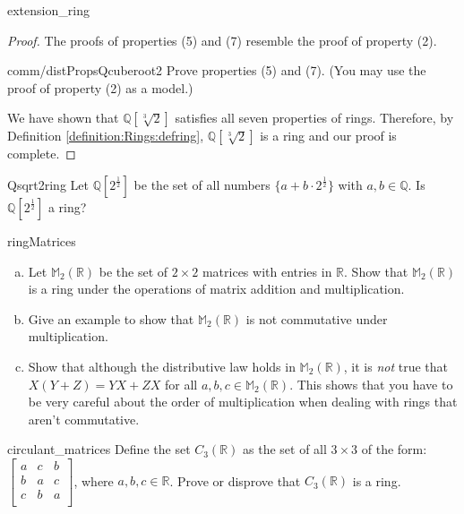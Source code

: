 \begin{example}{extension_ring}
\begin{proof}
The proofs of properties (5) and (7) resemble the proof of property (2).

\begin{exercise}{comm/distPropsQcuberoot2}
Prove properties (5) and (7). (You may use the proof of property (2) as a model.)
\end{exercise}{}

We have shown that ${\mathbb Q}[\sqrt[3]{2}]$ satisfies all seven properties of rings. Therefore, by Definition \ref{definition:Rings:defring}, ${\mathbb Q}[\sqrt[3]{2}]$ is a ring and our proof is complete.
\end{proof}
\end{example}{}

\begin{exercise}{Qsqrt2ring}
Let ${\mathbb Q}[2^{\frac{1}{2}}]$ be the set of all numbers $\{a+b\cdot2^{\frac{1}{2}}\}$ with $a,b\in {\mathbb Q}$. Is ${\mathbb Q}[2^{\frac{1}{2}}]$ a ring?
\end{exercise}

\begin{exercise}{ringMatrices}
\begin{enumerate}[(a)]
\item Let ${\mathbb M}_2({\mathbb R})$ be the set of  $2\times 2$ matrices with entries in ${\mathbb R}$. Show that ${\mathbb M}_2({\mathbb R})$ is a ring under the operations of matrix addition and multiplication.
\item Give an example to show that ${\mathbb M}_2({\mathbb R})$ is not commutative under multiplication.
\item Show that although the distributive law holds in ${\mathbb M}_2({\mathbb R})$, it is \emph{not} true that $X(Y+ Z) = YX + ZX$ for all $a,b,c \in {\mathbb M}_2({\mathbb R})$. This shows that you have to be very careful about the order of multiplication when dealing with rings that aren't commutative.
\end{enumerate}
\end{exercise}{}

\begin{exercise}{circulant_matrices}
Define the set $C_3({\mathbb R})$ as the set of all $3\times3$  of the form:
$\begin{bmatrix}
a & c & b\\
b & a & c\\
c & b & a\\
\end{bmatrix}$,
where $a,b,c\in{\mathbb R}$.  Prove or disprove that $C_3({\mathbb R})$ is a ring.
\end{exercise}

